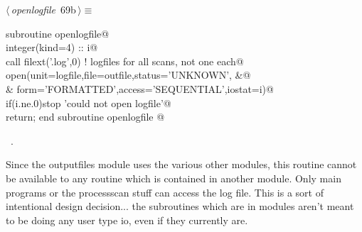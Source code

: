 \documentclass[10pt,a4paper,notitlepage]{article}
\begin{document}
\begin{flushleft} \small
\begin{minipage}{\linewidth}\label{scrap75}\raggedright\small
{} $\langle\,${\it openlogfile}\nobreak\ {\footnotesize {69b}}$\,\rangle\equiv$
\vspace{-1ex}
\begin{list}{}{} \item
\mbox{}\verb@      subroutine openlogfile@\\
\mbox{}\verb@      integer(kind=4) :: i@\\
\mbox{}\verb@      call filext('.log',0) ! logfiles for all scans, not one each@\\
\mbox{}\verb@      open(unit=logfile,file=outfile,status='UNKNOWN',                  &@\\
\mbox{}\verb@     & form='FORMATTED',access='SEQUENTIAL',iostat=i)@\\
\mbox{}\verb@      if(i.ne.0)stop 'could not open logfile'@\\
\mbox{}\verb@      return; end subroutine openlogfile                                     @{\NWsep}
\end{list}
\vspace{-1.5ex}
\footnotesize
\begin{list}{}{\setlength{\itemsep}{-\parsep}\setlength{\itemindent}{-\leftmargin}}
\item \NWtxtMacroRefIn\ .

\item{}
\end{list}
\end{minipage}\vspace{4ex}
\end{flushleft}
Since the outputfiles module uses the various other modules, this routine
cannot be available to any routine which is contained in another module.
Only main programs or the processscan stuff can access the log file. 
This is a sort of intentional design decision... the subroutines which are
in modules aren't meant to be doing any user type io, even if they currently
are.
\end{document}
